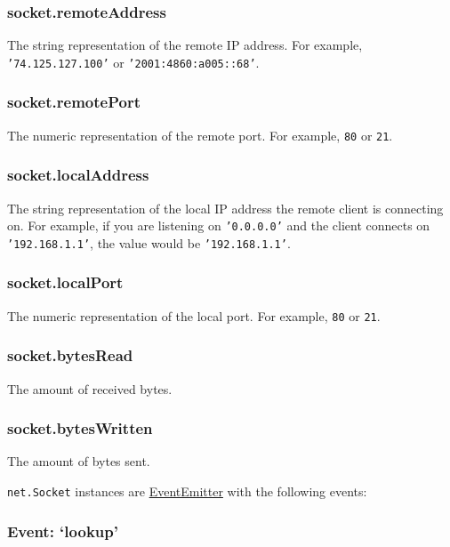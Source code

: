 \subsubsection{socket.remoteAddress}

The string representation of the remote IP address. For example,
\texttt{'74.125.127.100'} or \texttt{'2001:4860:a005::68'}.

\subsubsection{socket.remotePort}

The numeric representation of the remote port. For example, \texttt{80}
or \texttt{21}.

\subsubsection{socket.localAddress}

The string representation of the local IP address the remote client is
connecting on. For example, if you are listening on \texttt{'0.0.0.0'}
and the client connects on \texttt{'192.168.1.1'}, the value would be
\texttt{'192.168.1.1'}.

\subsubsection{socket.localPort}

The numeric representation of the local port. For example, \texttt{80}
or \texttt{21}.

\subsubsection{socket.bytesRead}

The amount of received bytes.

\subsubsection{socket.bytesWritten}

The amount of bytes sent.

\texttt{net.Socket} instances are
\href{events.html\#events\_class\_events\_eventemitter}{EventEmitter}
with the following events:

\subsubsection{Event: `lookup'}

